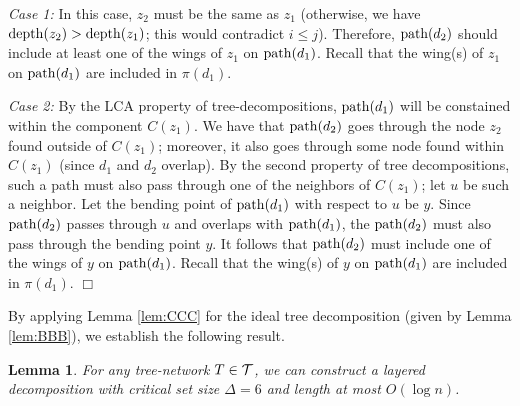 \documentclass[11pt]{article}
\newtheorem{lemma}[theorem]{\bf Lemma}
\newcommand{\qed} {\hfill$\Box$}
\newcommand{\calT} {{\cal T}}
\newcommand{\mypath} {{\rm path}}
\newcommand{\depth} {{\rm depth}}
\begin{document}
{\it Case 1: } In this case, $z_2$ must be the same as $z_1$ 
(otherwise, we have $\depth(z_2) > \depth(z_1)$; this would contradict $i\leq j$).
Therefore, $\mypath(d_2)$ should include at least one of the wings of $z_1$ on $\mypath(d_1)$. 
Recall that the wing(s) of $z_1$ on $\mypath(d_1)$ are included in $\pi(d_1)$.

{\it Case 2: }
By the LCA property of tree-decompositions, $\mypath(d_1)$ will be constained within the component $C(z_1)$.
We have that $\mypath(d_2)$ goes through the node $z_2$ found outside of $C(z_1)$;
moreover, it also goes through some node found within $C(z_1)$ (since $d_1$ and $d_2$ overlap).
By the second property of tree decompositions, such a path must also 
pass through one of the neighbors of $C(z_1)$; let $u$ be such a neighbor.
Let the bending point of $\mypath(d_1)$ with respect to $u$ be $y$.
Since $\mypath(d_2)$ passes through $u$ and overlaps with $\mypath(d_1)$,
the $\mypath(d_2)$ must also pass through the bending point $y$. 
It follows that $\mypath(d_2)$ must include one of the wings of $y$ on $\mypath(d_1)$.
Recall that the wing(s) of $y$ on $\mypath(d_1)$ are included in $\pi(d_1)$.
\qed

By applying Lemma \ref{lem:CCC} for the ideal tree decomposition (given by Lemma \ref{lem:BBB}),
we establish the following result.

\begin{lemma}
\label{lem:DDD}
For any tree-network $T\in \calT$, we can construct a layered decomposition with 
critical set size $\Delta = 6$ and length at most $O(\log n)$.
\end{lemma}
\end{document}
